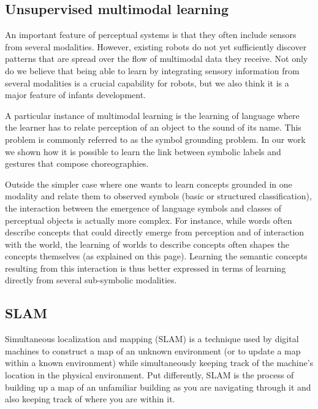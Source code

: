 \subsection{Unsupervised multimodal learning}


\cite{mangin2012learning,mangin2013learning,mangin2014thesis}

 An important feature of perceptual systems is that they often include sensors from several modalities. However, existing robots do not yet sufficiently discover patterns that are spread over the flow of multimodal data they receive. Not only do we believe that being able to learn by integrating sensory information from several modalities is a crucial capability for robots, but we also think it is a major feature of infants development.

A particular instance of multimodal learning is the learning of language where the learner has to relate perception of an object to the sound of its name. This problem is commonly referred to as the symbol grounding problem. In our work we shown how it is possible to learn the link between symbolic labels and gestures that compose choreographies.

Outside the simpler case where one wants to learn concepts grounded in one modality and relate them to observed symbols (basic or structured classification), the interaction between the emergence of language symbols and classes of perceptual objects is actually more complex. For instance, while words often describe concepts that could directly emerge from perception and of interaction with the world, the learning of worlds to describe concepts often shapes the concepts themselves (as explained on this page). Learning the semantic concepts resulting from this interaction is thus better expressed in terms of learning directly from several sub-symbolic modalities. 

\subsection{SLAM}

\cite{smith1990estimating} 
\cite{dissanayake2001solution}

Simultaneous localization and mapping (SLAM) is a technique used by digital machines to construct a map of an unknown environment (or to update a map within a known environment) while simultaneously keeping track of the machine's location in the physical environment. Put differently, SLAM is the process of building up a map of an unfamiliar building as you are navigating through it and also keeping track of where you are within it.


